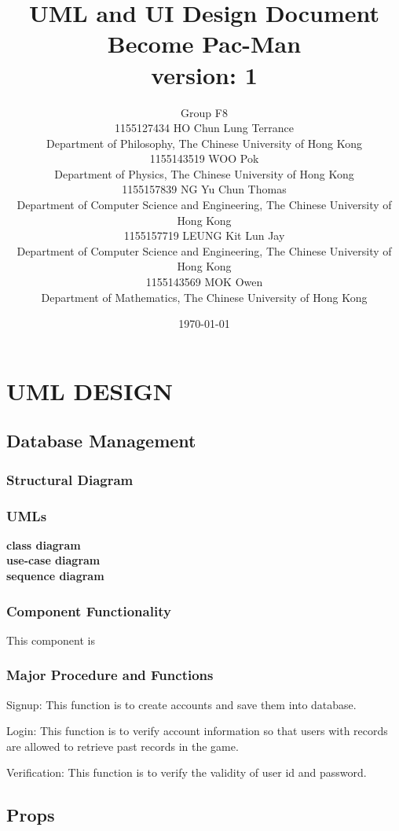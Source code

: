 \documentclass[11pt]{article}
\title{UML and UI Design Document\\Become Pac-Man\\version: 1}
\author{Group F8\\1155127434 HO Chun Lung Terrance\\
Department of Philosophy, The Chinese University of Hong Kong\\1155143519 WOO Pok\\
Department of Physics, The Chinese University of Hong Kong\\1155157839 NG Yu Chun Thomas\\
Department of Computer Science and Engineering, The Chinese University of Hong Kong\\1155157719 LEUNG Kit Lun Jay\\
Department of Computer Science and Engineering, The Chinese University of Hong Kong\\1155143569 MOK Owen\\
Department of Mathematics, The Chinese University of Hong Kong}
\date{\today}
\begin{document}
\maketitle
\tableofcontents
\newpage
\section{UML DESIGN}

\subsection{Database Management}
\subsubsection{Structural Diagram}
\subsubsection{UMLs}
\textbf{class diagram}\\
\textbf{use-case diagram}\\
\textbf{sequence diagram}\\
\subsubsection{Component Functionality}
This component is 
\subsubsection{Major Procedure and Functions}
Signup: This function is to create accounts and save them into database.

Login: This function is to verify account information so that users with records are allowed to retrieve past records in the game.

Verification: This function is to verify the validity of user id and password.

\subsection{Props}
\end{document}
